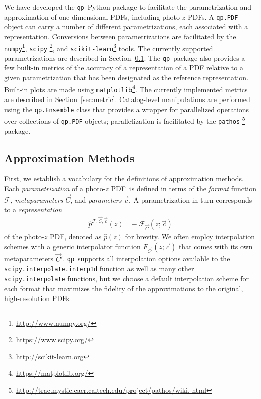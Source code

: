 \documentclass[\docopts]{\docclass}
\newcommand{\qp}{\texttt{qp}}
\newcommand{\pz}{photo-$z$ PDF}
\begin{document}
We have developed the \qp\ Python package to facilitate the parametrization and 
approximation of one-dimensional PDFs, including \pz s.
A \texttt{qp.PDF} object can carry a number of different parametrizations, each 
associated with a representation.
Conversions between parametrizations are facilitated by the 
\texttt{numpy}\footnote{\url{http://www.numpy.org/}}, \texttt{scipy} 
\footnote{\url{https://www.scipy.org/}}, and 
\texttt{scikit-learn}\footnote{\url{http://scikit-learn.org}} 
\citep{pedregosa_scikit-learn:_2011} tools.
The currently supported parametrizations are described in 
Section~\ref{sec:approx}.
The \qp\ package also provides a few built-in metrics of the accuracy of a 
representation of a PDF relative to a given parametrization that has been 
designated as the reference representation.
Built-in plots are made using 
\texttt{matplotlib}\footnote{\url{https://matplotlib.org/}}.
The currently implemented metrics are described in Section~\ref{sec:metric}.
Catalog-level manipulations are performed using the \texttt{qp.Ensemble} class 
that provides a wrapper for parallelized operations over collections of 
\texttt{qp.PDF} objects; parallelization is facilitated by the \texttt{pathos} 
\footnote{\noindent\url{http://trac.mystic.cacr.caltech.edu/project/pathos/wiki.
html}} \citep{mckerns_building_2012, mckerns_pathos:_2010} package.

\subsection{Approximation Methods}
\label{sec:approx}

First, we establish a vocabulary for the definitions of approximation methods.
Each \textit{parametrization} of a \pz\ is defined in terms of the 
\textit{format} function $\mathcal{F}$, \textit{metaparameters} $\vec{C}$, and 
\textit{parameters} $\vec{c}$.
A parametrization in turn corresponds to a \textit{representation}
\begin{align}
  \label{eq:definition}
  \hat{p}^{\mathcal{F}, \vec{C}, \vec{c}}(z) &\equiv \mathcal{F}_{\vec{C}}(z; 
\vec{c})
\end{align}
of the \pz, denoted as $\hat{p}(z)$ for brevity.
We often employ interpolation schemes with a generic interpolator function 
$F_{\vec{C}'}(z; \vec{c})$ that comes with its own metaparameters $\vec{C}'$.
\qp\ supports all interpolation options available to the 
\texttt{scipy.interpolate.interp1d} function as well as many other 
\texttt{scipy.interpolate} functions, but we choose a default interpolation 
scheme for each format that maximizes the fidelity of the approximations to the 
original, high-resolution PDFs.
\end{document}
